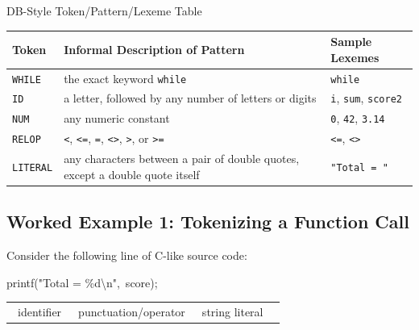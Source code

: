 \documentclass[full-course-notes.tex]{subfiles}
\begin{document}
\begin{examplebox}{DB-Style Token/Pattern/Lexeme Table}
\renewcommand{\arraystretch}{1.3}
\begin{tabularx}{\textwidth}{@{}l X l@{}}
\toprule
\textbf{Token} & \textbf{Informal Description of Pattern} & \textbf{Sample Lexemes} \\
\midrule
\texttt{WHILE} & the exact keyword \texttt{while} & \texttt{while} \\
\texttt{ID} & a letter, followed by any number of letters or digits & \texttt{i}, \texttt{sum}, \texttt{score2} \\
\texttt{NUM} & any numeric constant & \texttt{0}, \texttt{42}, \texttt{3.14} \\
\texttt{RELOP} & \texttt{<}, \texttt{<=}, \texttt{=}, \texttt{<>}, \texttt{>}, or \texttt{>=} & \texttt{<=}, \texttt{<>} \\
\texttt{LITERAL} & any characters between a pair of double quotes, except a double quote itself & \texttt{"Total = "} \\
\bottomrule
\end{tabularx}
\end{examplebox}

\subsection{Worked Example 1: Tokenizing a Function Call}
\label{sec:l3-worked-example-1}

Consider the following line of C-like source code:

\begin{center}
\ttfamily\large
\colorbox{dbGreenBg}{printf}\colorbox{examRedBg}{(}\colorbox{enrichGoldBg}{"Total = \%d\textbackslash n"}\colorbox{examRedBg}{,}\ \colorbox{dbGreenBg}{score}\colorbox{examRedBg}{)}\colorbox{examRedBg}{;}
\end{center}
\begin{center}
\small\begin{tabular}{@{}p{2.6cm}p{2.6cm}p{2.6cm}p{2.6cm}@{}}
\colorbox{dbGreenBg}{\phantom{x}}\ identifier &
\colorbox{examRedBg}{\phantom{x}}\ punctuation/operator &
\colorbox{enrichGoldBg}{\phantom{x}}\ string literal &
\end{tabular}
\end{center}
\end{document}
